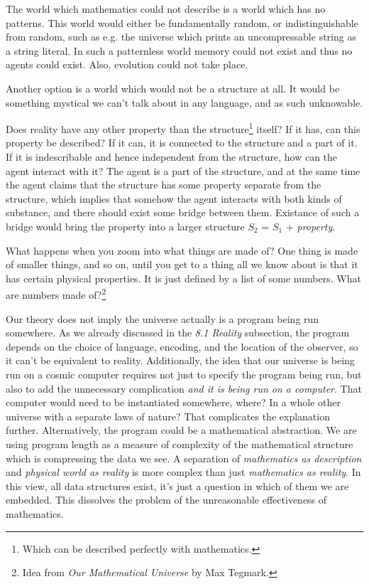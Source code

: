 \documentclass[oneside,hidelinks]{article}
\begin{document}
The world which mathematics could not describe is a world which has no patterns.
This world would either be fundamentally random, or indistinguishable from random, such as e.g. the universe which prints an uncompressable string as a string literal.
In such a patternless world memory could not exist and thus no agents could exist.
Also, evolution could not take place.

Another option is a world which would not be a structure at all.
It would be something mystical we can't talk about in any language, and as such unknowable.

Does reality have any other property than the structure\footnote{Which can be described perfectly with mathematics.} itself?
If it has, can this property be described?
If it can, it is connected to the structure and a part of it.
If it is indescribable and hence independent from the structure, how can the agent interact with it?
The agent is a part of the structure, and at the same time the agent claims that the structure has some property separate from the structure, which implies that somehow the agent interacts with both kinds of substance, and there should exist some bridge between them.
Existance of such a bridge would bring the property into a larger structure $S_2$ = $S_1$ + \textit{property}.

What happens when you zoom into what things are made of?
One thing is made of smaller things, and so on, until you get to a thing all we know about is that it has certain physical properties.
It is just defined by a list of some numbers.
What are numbers made of?\footnote{Idea from \textit{Our Mathematical Universe} by Max Tegmark.}

Our theory does not imply the universe actually is a program being run somewhere.
As we already discussed in the \textit{8.1 Reality} subsection, the program depends on the choice of language, encoding, and the location of the observer, so it can't be equivalent to reality.
Additionally, the idea that our universe is being run on a cosmic computer requires not just to specify the program being run, but also to add the unnecessary complication \textit{and it is being run on a computer}.
That computer would need to be instantiated somewhere, where?
In a whole other universe with a separate laws of nature?
That complicates the explanation further.
Alternatively, the program could be a mathematical abstraction.
We are using program length as a measure of complexity of the mathematical structure which is compressing the data we see.
A separation of \textit{mathematics as description} and \textit{physical world as reality} is more complex than just \textit{mathematics as reality}.
In this view, all data structures exist, it's just a question in which of them we are embedded.
This dissolves the problem of the unreasonable effectiveness of mathematics.
\end{document}
